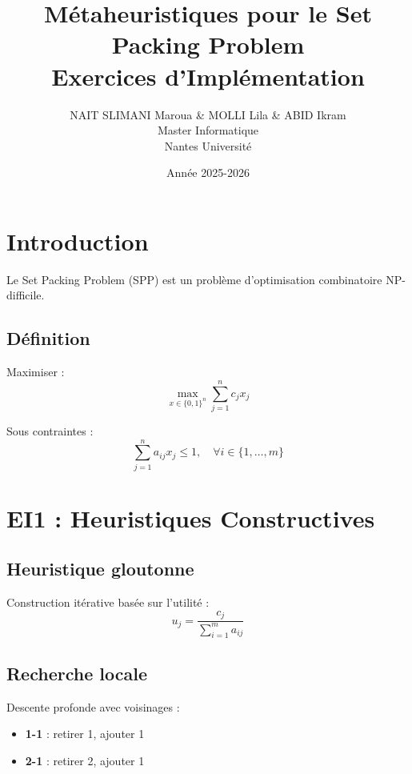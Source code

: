 \documentclass[11pt,a4paper]{article}
\title{%
    \textbf{Métaheuristiques pour le Set Packing Problem} \\
    \large Exercices d'Implémentation
}
\author{NAIT SLIMANI Maroua \& MOLLI Lila \& ABID Ikram \\ Master Informatique \\ Nantes Université}
\date{Année 2025-2026}
\begin{document}
\maketitle
\tableofcontents
\newpage

\section{Introduction}

Le Set Packing Problem (SPP) est un problème d'optimisation combinatoire NP-difficile.

\subsection{Définition}

Maximiser :
\begin{equation}
    \max_{x \in \{0,1\}^n} \sum_{j=1}^{n} c_j x_j
\end{equation}

Sous contraintes :
\begin{equation}
    \sum_{j=1}^{n} a_{ij} x_j \leq 1, \quad \forall i \in \{1,\ldots,m\}
\end{equation}

\section{EI1 : Heuristiques Constructives}

\subsection{Heuristique gloutonne}

Construction itérative basée sur l'utilité :
\begin{equation}
    u_j = \frac{c_j}{\sum_{i=1}^{m} a_{ij}}
\end{equation}

\subsection{Recherche locale}

Descente profonde avec voisinages :
\begin{itemize}
    \item \textbf{1-1} : retirer 1, ajouter 1
    \item \textbf{2-1} : retirer 2, ajouter 1
\end{itemize}
\end{document}
